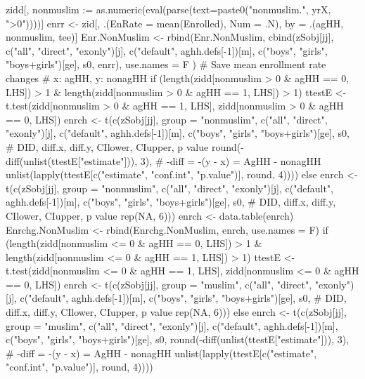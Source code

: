 \begin{Schunk}
\begin{Sinput}
{{{{{{              zidd[, nonmuslim := as.numeric(eval(parse(text=paste0("nonmuslim.", yrX, ">0"))))]
              enrr <- zid[, .(EnRate = mean(Enrolled), Num = .N), by = .(agHH, nonmuslim, tee)]
              Enr.NonMuslim <- rbind(Enr.NonMuslim, 
                cbind(zSobj[jj], c("all", "direct", "exonly")[j], c("default", aghh.defs[-1])[m],
                  c("boys", "girls", "boys+girls")[ge], s0, enrr),
                use.names = F
              )
              # Save mean enrollment rate changes
              # x: agHH, y: nonagHH
              if (length(zidd[nonmuslim > 0 & agHH == 0, LHS]) > 1 & 
                length(zidd[nonmuslim > 0 & agHH == 1, LHS]) > 1) {
                ttestE <- t.test(zidd[nonmuslim > 0 & agHH == 1, LHS], zidd[nonmuslim > 0 & agHH == 0, LHS])
                enrch <- t(c(zSobj[jj], group = "nonmuslim",
                  c("all", "direct", "exonly")[j], c("default", aghh.defs[-1])[m],
                  c("boys", "girls", "boys+girls")[ge], s0,
                    # DID, diff.x, diff.y, CIlower, CIupper, p value
                  round(-diff(unlist(ttestE["estimate"])), 3), # -diff = -(y - x) = AgHH - nonagHH
                  unlist(lapply(ttestE[c("estimate", "conf.int", "p.value")], round, 4))))
              } else 
                enrch <- t(c(zSobj[jj], group = "nonmuslim",
                  c("all", "direct", "exonly")[j], c("default", aghh.defs[-1])[m],
                  c("boys", "girls", "boys+girls")[ge], s0,
                    # DID, diff.x, diff.y, CIlower, CIupper, p value
                  rep(NA, 6)))
              enrch <- data.table(enrch)
              Enrchg.NonMuslim <- rbind(Enrchg.NonMuslim, enrch, use.names = F)
              if (length(zidd[nonmuslim <= 0 & agHH == 0, LHS]) > 1 & 
                length(zidd[nonmuslim <= 0 & agHH == 1, LHS]) > 1) {
                ttestE <- t.test(zidd[nonmuslim <= 0 & agHH == 1, LHS], zidd[nonmuslim <= 0 & agHH == 0, LHS])
                enrch <- t(c(zSobj[jj], group = "muslim",
                  c("all", "direct", "exonly")[j], c("default", aghh.defs[-1])[m],
                  c("boys", "girls", "boys+girls")[ge], s0,
                    # DID, diff.x, diff.y, CIlower, CIupper, p value
                  rep(NA, 6)))
              } else
                enrch <- t(c(zSobj[jj], group = "muslim", 
                  c("all", "direct", "exonly")[j], c("default", aghh.defs[-1])[m],
                  c("boys", "girls", "boys+girls")[ge], s0,
                  round(-diff(unlist(ttestE["estimate"])), 3), # -diff = -(y - x) = AgHH - nonagHH
                  unlist(lapply(ttestE[c("estimate", "conf.int", "p.value")], round, 4))))
}}}}}}
\end{Sinput}
\end{Schunk}
